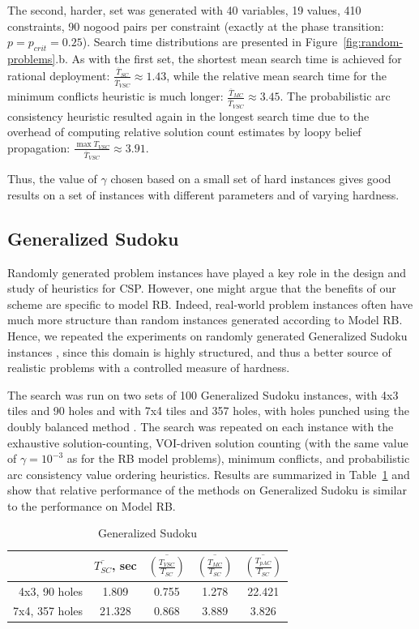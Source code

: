 The second, harder, set was generated with 40 variables, 19 values,
410 constraints, 90 nogood pairs per constraint (exactly at the phase
transition: $p=p_{crit}=0.25$).
Search time distributions are presented in Figure~\ref{fig:random-problems}.b.
As with the first set, the shortest mean search time is achieved for
rational deployment: $\frac {\overline T_{SC}} {\overline T_{VSC}}
\approx 1.43 $,  while the relative mean search time for the minimum
conflicts heuristic is much longer: $\frac {\overline T_{MC}}
{\overline T_{VSC}} \approx 3.45$. The probabilistic arc consistency heuristic
resulted again in the longest search time due to the overhead of computing
relative solution count estimates by loopy belief propagation: $\frac
{\max T_{VSC}} {\overline T_{VSC}} \approx 3.91$. 

Thus, the value of $\gamma$ chosen based on a small set of hard instances
gives good results on a set of instances with different parameters and
of varying hardness.

\subsection{Generalized Sudoku}

Randomly generated problem instances have played a key role in the
design and study of heuristics for CSP. However, one might argue that the
benefits of our scheme are specific to model RB. Indeed, real-world problem
instances often have much more structure than random instances
generated according to Model RB. Hence, we repeated the experiments
on randomly generated Generalized Sudoku
instances \cite{Ansotegui.sudoku}, since this domain is highly
structured, and thus a better source of realistic problems with a controlled
measure of hardness.

The search was run on two sets of 100 Generalized Sudoku instances,
with 4x3 tiles and 90 holes and with 7x4 tiles and 357 holes, with
holes punched using the doubly balanced method
\cite{Ansotegui.sudoku}. The search was repeated on each instance with
the exhaustive solution-counting, VOI-driven solution counting (with
the same value of $\gamma=10^{-3}$ as for the RB model problems),
minimum conflicts, and probabilistic arc
consistency value ordering heuristics. Results
are summarized in Table~\ref{tbl:sudoku} and show that relative
performance of the methods on Generalized Sudoku is similar to the
performance on Model RB.
\begin{table}[h]
\begin{center}
\small
\begin{tabular}{r|c|c|c|c}
               & $\overline {T_{SC}}$, sec & $\overline {\left(\frac
                   {T_{VSC}} {T_{SC}}\right)}$ & $\overline
               {\left(\frac {T_{MC}} {T_{SC}}\right)}$ & $\overline
               {\left(\frac {T_{pAC}} {T_{SC}} \right)}$ \\  \hline
4x3, 90 holes &  1.809 & 0.755 & 1.278 & 22.421 \\  \hline
7x4, 357 holes & 21.328 & 0.868 & 3.889 & 3.826
\end{tabular}
\end{center}
\caption{Generalized Sudoku}
\label{tbl:sudoku}
\end{table}

